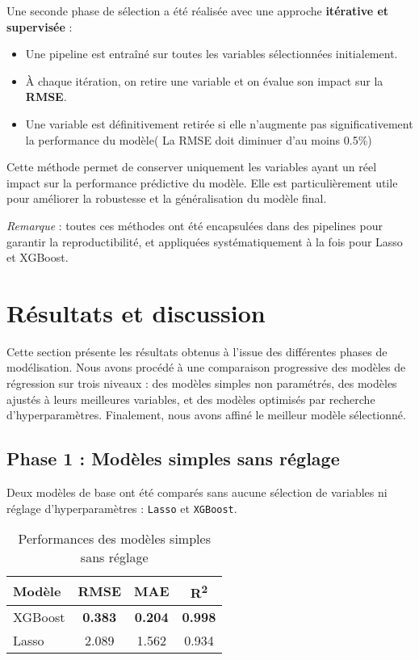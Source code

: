 Une seconde phase de sélection a été réalisée avec une approche \textbf{itérative et supervisée} :

\begin{itemize}
  \item Une pipeline est entraîné sur toutes les variables sélectionnées initialement.
  \item À chaque itération, on retire une variable et on évalue son impact sur  la \textbf{RMSE}.
  \item Une variable est définitivement retirée si elle n’augmente pas significativement la performance du modèle( La RMSE doit diminuer d'au moins 0.5\%)
\end{itemize}

Cette méthode permet de conserver uniquement les variables ayant un réel impact sur la performance prédictive du modèle. Elle est particulièrement utile pour améliorer la robustesse et la généralisation du modèle final.

\vspace{0.5em}
\textit{Remarque} : toutes ces méthodes ont été encapsulées dans des pipelines pour garantir la reproductibilité, et appliquées systématiquement à la fois pour Lasso et XGBoost.

\section{Résultats et discussion}

Cette section présente les résultats obtenus à l’issue des différentes phases de modélisation. Nous avons procédé à une comparaison progressive des modèles de régression sur trois niveaux : des modèles simples non paramétrés, des modèles ajustés à leurs meilleures variables, et des modèles optimisés par recherche d’hyperparamètres. Finalement, nous avons affiné le meilleur modèle sélectionné.

\subsection{Phase 1 : Modèles simples sans réglage}

Deux modèles de base ont été comparés sans aucune sélection de variables ni réglage d’hyperparamètres : \texttt{Lasso} et \texttt{XGBoost}.



\begin{table}[h]
\centering
\begin{tabular}{|l|c|c|c|}
\hline
\textbf{Modèle} & \textbf{RMSE} & \textbf{MAE} & \textbf{R\textsuperscript{2}} \\
\hline
XGBoost & \textbf{0.383} & \textbf{0.204} & \textbf{0.998} \\
Lasso & 2.089 & 1.562 & 0.934 \\
\hline
\end{tabular}
\caption{Performances des modèles simples sans réglage}
\end{table}

